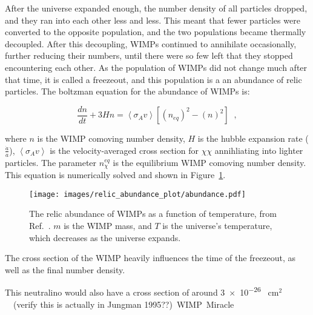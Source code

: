   
  After the universe expanded enough, the number density of all particles dropped, and they ran into each other less and less.
  This meant that fewer particles were converted to the opposite population, and the two populations became thermally decoupled.
  After this decoupling, WIMPs continued to annihilate occasionally, further reducing their numbers, until there were so few left that they stopped encountering each other.
  As the population of WIMPs did not change much after that time, it is called a freezeout, and this population is a an abundance of relic particles.
  The boltzman equation for the abundance of WIMPs is:
  
  \begin{equation}\label{eqn:boltzmann_relic}
  \frac{dn}{dt} + 3 H n = \left \langle \sigma_{A} v \right \rangle \left [ \left ( n_{eq} \right )^2 - \left ( n \right )^2 \right ] \;\;,
  \end{equation}
  
  where $n$ is the WIMP comoving number density, $H$ is the hubble expansion rate ($\frac{\dot{a}}{a}$), $\left \langle \sigma_{A} v \right \rangle$ is the velocity-averaged cross section for $\chi\chi$ annihliating into lighter particles.
  The parameter $n^{eq}_{\chi}$ is the equilibrium WIMP comoving number density.
  This equation is numerically solved and shown in Figure~\ref{fig:abundance}.
  
  \begin{figure}[ht]
    \centering
    \texttt{[image: images/relic\_abundance\_plot/abundance.pdf]}
    \caption[Relic Abundance vs Time]{
      The relic abundance of WIMPs as a function of temperature, from Ref.~\cite{Jungman:1995df}.
      $m$ is the WIMP mass, and $T$ is the universe's temperature, which decreases as the universe expands.
    }
    \label{fig:abundance}
  \end{figure}
  
  The cross section of the WIMP heavily influences the time of the freezeout, as well as the final number density.
  
  This neutralino would also have a cross section of around \nicetilde{} \SI{3e-26}{ cm${}^2$ }~\cite{Jungman:1995df} {\color{red}(verify this is actually in Jungman 1995??)}.
  
  WIMP Miracle
  
